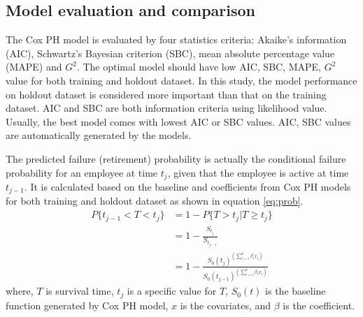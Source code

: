 \documentclass[12pt,letterpaper]{article}
\begin{document}
\subsection{Model evaluation and comparison}

The Cox PH model is evaluated by four statistics criteria:  Akaike’s information (AIC), Schwartz’s Bayesian criterion (SBC), mean absolute percentage value (MAPE) and $G^2$. The optimal model should have low AIC, SBC, MAPE, $G^2$ value for both training and holdout dataset. In this study, the model performance on holdout dataset is considered more important than that on the training dataset.  AIC and SBC are both information criteria using likelihood value. Usually, the best model comes with lowest AIC or SBC values. AIC, SBC values are automatically generated by the models.

The predicted failure (retirement) probability is actually the conditional failure probability for an employee at time $t_j$, given that the employee is active at time $t_{j-1}$. It is calculated based on the baseline and coefficients from Cox PH models for both training and holdout dataset as shown in equation \ref{eq:prob}.
\begin{equation}
\label{eq:prob}
\begin{split}%
P\{t_{j-1}<T<t_j\} &=1-P\{T>t_j|T \ge t_j\}\\
&=1-\frac{S_{t_j}}{S_{t_{j-1}}}   \\
&=1-\frac{{S_0(t_j)}^{(\sum_{i=1}^{k}\beta_ix_i)}}{   {S_0(t_{j-1})}^{(\sum_{i=1}^{k}\beta_ix_i)}}
\end{split}
\end{equation}
where, $T$ is survival time, $t_j$ is a specific value for $T$, $S_0(t)$ is the baseline function generated by Cox PH model, $x$ is the covariates, and $\beta$ is the coefficient.
\end{document}
